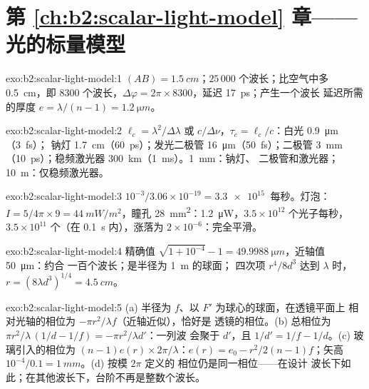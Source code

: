 \section*{第 \ref{ch:b2:scalar-light-model} 章——光的标量模型}

\begin{solution}{exo:b2:scalar-light-model:1}
$(AB) = \qty{1.5}{cm}$；$25\,000$ 个波长；比空气中多 \qty{0.5}{cm}，即 $8300$
个波长，$\Delta\varphi = 2\pi \times 8300$，延迟 \qty{17}{ps}；产生一个波长
延迟所需的厚度 $e = \lambda/(n - 1) = \qty{1.2}{\micro m}$。
\end{solution}

\begin{solution}{exo:b2:scalar-light-model:2}
$\ell_c = \lambda^2/\Delta\lambda$ 或 $c/\Delta\nu$，$\tau_c = \ell_c/c$：白光 \qty{0.9}{\micro m}（\qty{3}{fs}）；
钠灯 \qty{1.7}{cm}（\qty{60}{ps}）；发光二极管 \qty{16}{\micro m}（\qty{50}{fs}）；二极管 \qty{3}{mm}
（\qty{10}{ps}）；稳频激光器 \qty{300}{km}（\qty{1}{ms}）。\qty{1}{mm}：钠灯、
二极管和激光器；\qty{10}{m}：仅稳频激光器。
\end{solution}

\begin{solution}{exo:b2:scalar-light-model:3}
$10^{-3}/3.06 \times 10^{-19} = \qty{3.3e15}{}$ 每秒。灯泡：$I = 5/4\pi \times 9 =
\qty{44}{mW/m^2}$，瞳孔 \qty{28}{mm^2}：\qty{1.2}{\micro W}，$3.5 \times 10^{12}$ 个光子每秒，
$3.5 \times 10^{11}$ 个（在 \qty{0.1}{s} 内），涨落为 $2 \times 10^{-6}$：完全平滑。
\end{solution}

\begin{solution}{exo:b2:scalar-light-model:4}
精确值 $\sqrt{1 + 10^{-4}} - 1 = \qty{49.9988}{\micro m}$，近轴值 \qty{50}{\micro m}：约合
一百个波长；是半径为 \qty{1}{m} 的球面；
四次项 $r^4/8d^3$ 达到 $\lambda$ 时，$r = (8\lambda d^3)^{1/4} = \qty{4.5}{cm}$。
\end{solution}

\begin{solution}{exo:b2:scalar-light-model:5}
(a) 半径为 $f$、以 $F'$ 为球心的球面，在透镜平面上
相对光轴的相位为 $-\pi r^2/\lambda f$（近轴近似），恰好是
透镜的相位。(b) 总相位为 $\pi r^2/\lambda\,(1/d - 1/f) = -\pi r^2/\lambda d'$：一列波
会聚于 $d'$，且 $1/d' = 1/f - 1/d$。(c) 玻璃引入的相位为 $(n - 1)e(r)
\times2\pi/\lambda$：$e(r) = e_0 - r^2/2(n - 1)f$；矢高 $10^{-4}/0.1 = \qty{1}{mm}$。(d) 按模 $2\pi$ 定义的
相位仍是同一相位——在设计
波长下如此；在其他波长下，台阶不再是整数个波长。
\end{solution}

